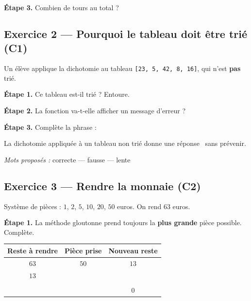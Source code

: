 \bigskip

\textbf{Étape 3.} Combien de tours au total ?

\medskip
\dotfill

\bigskip
\bigskip

\subsection*{Exercice 2 --- Pourquoi le tableau doit être trié (C1)}

Un élève applique la dichotomie au tableau \texttt{[23, 5, 42, 8, 16]},
qui n'est \textbf{pas} trié.

\bigskip

\textbf{Étape 1.} Ce tableau est-il trié ? Entoure.

\medskip
\begin{center}
 \qquad {}
\end{center}

\bigskip

\textbf{Étape 2.} La fonction va-t-elle afficher un message d'erreur ?

\medskip
\begin{center}
 \qquad {}
\end{center}

\bigskip

\textbf{Étape 3.} Complète la phrase :

\medskip
La dichotomie appliquée à un tableau non trié donne une réponse
\dotfill\ sans prévenir.

\medskip
\textit{Mots proposés :} correcte --- fausse --- lente

\bigskip
\bigskip

\subsection*{Exercice 3 --- Rendre la monnaie (C2)}

Système de pièces : $1$, $2$, $5$, $10$, $20$, $50$ euros. On rend $63$ euros.

\bigskip

\textbf{Étape 1.} La méthode gloutonne prend toujours la \textbf{plus grande}
pièce possible. Complète.

\bigskip

\begin{center}
\begin{tabular}{|c|c|c|}
\hline
\textbf{Reste à rendre} & \textbf{Pièce prise} & \textbf{Nouveau reste} \\
\hline
$63$ & $50$ & $13$ \\
\hline
$13$ & \dotfill & \dotfill \\
\hline
\dotfill & \dotfill & \dotfill \\
\hline
\dotfill & \dotfill & $0$ \\
\hline
\end{tabular}
\end{center}

